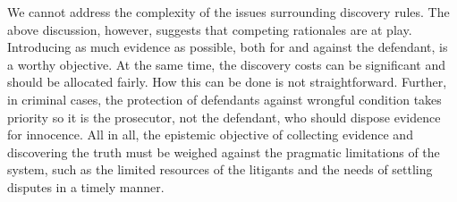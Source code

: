 \documentclass[10pt]{article}
\begin{document}
 







We cannot address the complexity of the issues surrounding discovery rules. The above discussion, however, suggests that competing rationales are at play. Introducing as much evidence as possible, both for and against the defendant, is a worthy objective. At the same time, the discovery costs can be significant and should be allocated fairly. How this can be done is not straightforward. Further, in criminal cases, the protection of defendants against wrongful condition takes priority so it is the prosecutor, not the defendant, who should dispose evidence for innocence. All in all, the epistemic objective of collecting evidence and discovering the truth must be weighed against the pragmatic limitations of the system, such as the limited resources of the litigants and the needs of settling disputes in a timely manner.
\end{document}
